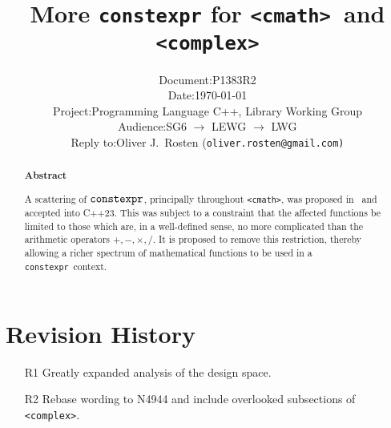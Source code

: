 \documentclass[prd,twocolumn,amsmath,amssymb,nofootinbib,eqsecnum]{revtex4-1}
\newcommand{\constexpr}{\code{constexpr}\xspace}
\newcommand{\code}[1]{{\tt #1}}
\newcommand{\header}[1]{{\tt <#1>}}
\newcommand{\cmath}{\header{cmath}}
\newcommand{\complex}{\header{complex}}
\newcommand{\Operators}{\ensuremath{+,-,\times,/}}
\begin{document}
\title{More \constexpr for \cmath\ and \complex}

\author{
\begin{tabular}{ll}
	Document: & P1383R2
\\
	Date: & \today
\\
	Project: & Programming Language C++, Library Working Group
\\
	Audience: & SG6 $\rightarrow$ LEWG $\rightarrow$ LWG
\\
	Reply to: & Oliver J.\ Rosten {(\tt oliver.rosten@gmail.com)}
\end{tabular}
}

\begin{abstract}

\begin{center} {\bf Abstract} \end{center}

A scattering of $\constexpr$, principally throughout \cmath, was proposed in~\cite{Rosten-constexpr} and accepted into C++23. This was subject to a constraint that the affected functions be limited to those which are, in a well-defined sense, no more complicated than the arithmetic operators \Operators. It is proposed to remove this restriction, thereby allowing a richer spectrum of mathematical functions to be used in a \constexpr\ context. 


\end{abstract}


\maketitle
\tableofcontents

\section{Revision History}

\begin{enumerate}
	\item[R1] Greatly expanded analysis of the design space.
	
	\item[R2] Rebase wording to N4944 and include overlooked subsections of \complex.
\end{enumerate}
\end{document}
